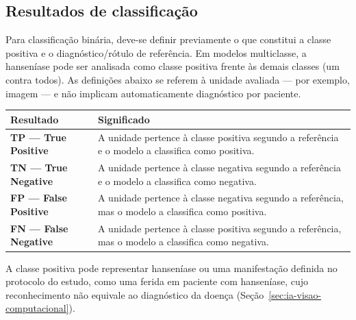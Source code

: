 \subsection{Resultados de
	classificação}\label{resultados-de-classificauxe7uxe3o}

Para classificação binária, deve-se definir previamente o que constitui
a classe positiva e o diagnóstico/rótulo de referência. Em modelos
multiclasse, a hanseníase pode ser analisada como classe positiva frente
às demais classes (um contra todos). As definições abaixo se referem à
unidade avaliada --- por exemplo, imagem --- e não implicam
automaticamente diagnóstico por paciente.

	{\def\LTcaptype{none} %
		\begin{longtable}[]{|>{\raggedright\arraybackslash}p{}|>{\raggedright\arraybackslash}p{}|}
			\hline
			\begin{minipage}[b]{\linewidth}\raggedright
				Resultado
			\end{minipage} & \begin{minipage}[b]{\linewidth}\raggedright
				                 Significado
			                 \end{minipage}                        \\ \hline
			\endhead
			
			\endlastfoot
			\textbf{TP --- True Positive}               & A unidade pertence à classe positiva
			segundo a referência e o modelo a classifica como positiva.                        \\ \hline
			\textbf{TN --- True Negative}               & A unidade pertence à classe negativa
			segundo a referência e o modelo a classifica como negativa.                        \\ \hline
			\textbf{FP --- False Positive}              & A unidade pertence à classe negativa
			segundo a referência, mas o modelo a classifica como positiva.                     \\ \hline
			\textbf{FN --- False Negative}              & A unidade pertence à classe positiva
			segundo a referência, mas o modelo a classifica como negativa.                     \\ \hline
		\end{longtable}
	}

A classe positiva pode representar hanseníase ou uma manifestação
definida no protocolo do estudo, como uma ferida em paciente com hanseníase,
cujo reconhecimento não equivale ao diagnóstico da doença
(Seção~\ref{sec:ia-visao-computacional}).

